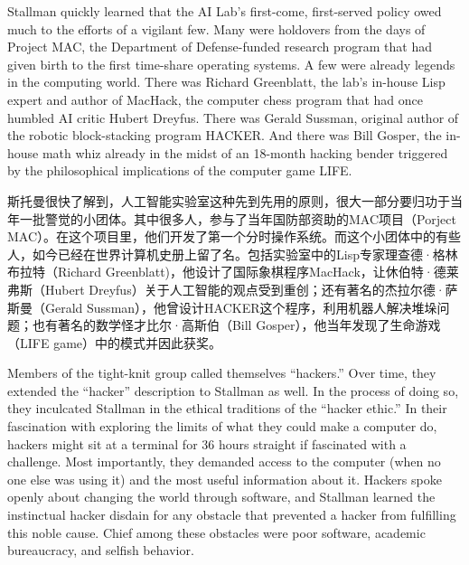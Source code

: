 \ifdefined\eng
Stallman quickly learned that the AI Lab's first-come, first-served policy owed much to the efforts of a vigilant few. Many were holdovers from the days of Project MAC, the Department of Defense-funded research program that had given birth to the first time-share operating systems. A few were already legends in the computing world. There was Richard Greenblatt, the lab's in-house Lisp expert and author of MacHack, the computer chess program that had once humbled AI critic Hubert Dreyfus. There was Gerald Sussman, original author of the robotic block-stacking program HACKER. And there was Bill Gosper, the in-house math whiz already in the midst of an 18-month hacking bender triggered by the philosophical implications of the computer game LIFE.
\fi

\ifdefined\chs
斯托曼很快了解到，人工智能实验室这种先到先用的原则，很大一部分要归功于当年一批警觉的小团体。其中很多人，参与了当年国防部资助的MAC项目（Porject MAC）。在这个项目里，他们开发了第一个分时操作系统。而这个小团体中的有些人，如今已经在世界计算机史册上留了名。包括实验室中的Lisp专家理查德·格林布拉特（Richard Greenblatt)，他设计了国际象棋程序MacHack，让休伯特·德莱弗斯（Hubert Dreyfus）关于人工智能的观点受到重创；还有著名的杰拉尔德·萨斯曼（Gerald Sussman），他曾设计HACKER这个程序，利用机器人解决堆垛问题；也有著名的数学怪才比尔·高斯伯（Bill Gosper），他当年发现了生命游戏（LIFE game）中的模式并因此获奖。
\fi

\ifdefined\eng
Members of the tight-knit group called themselves ``hackers.'' Over time, they extended the ``hacker'' description to Stallman as well. In the process of doing so, they inculcated Stallman in the ethical traditions of the ``hacker ethic.'' In their fascination with exploring the limits of what they could make a computer do, hackers might sit at a terminal for 36 hours straight if fascinated with a challenge. Most importantly, they demanded access to the computer (when no one else was using it) and the most useful information about it. Hackers spoke openly about changing the world through software, and Stallman learned the instinctual hacker disdain for any obstacle that prevented a hacker from fulfilling this noble cause. Chief among these obstacles were poor software, academic bureaucracy, and selfish behavior.
\fi


